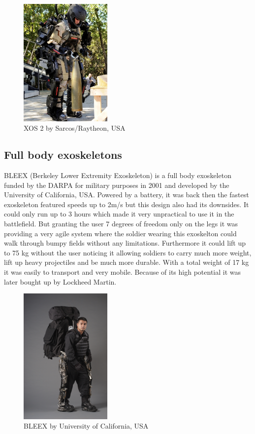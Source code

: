 \documentclass[letterpaper, 10 pt, conference]{ieeeconf}  %
\begin{document}
\newpage

\begin{figure}[H]
  \centering
    \includegraphics[width=0.4\textwidth]{img/xos2}
  \caption{XOS 2 by Sarcos/Raytheon, USA}
\end{figure}

\subsection{Full body exoskeletons}

BLEEX (Berkeley Lower Extremity Exoskeleton) is a full body exoskeleton funded by the DARPA for military purposes in 2001 and developed by the University of California, USA. Powered by a battery, it was back then the fastest exoskeleton featured speeds up to 2m/s but this design also had its downsides. It could only run up to 3 hours which made it very unpractical to use it in the battlefield. But granting the user 7 degrees of freedom only on the legs it was providing a very agile system where the soldier wearing this exoskelton could walk through bumpy fields without any limitations. Furthermore it could lift up to 75 kg without the user noticing it allowing soldiers to carry much more weight, lift up heavy projectiles and be much more durable. With a total weight of 17 kg it was easily to transport and very mobile. Because of its high potential it was later bought up by Lockheed Martin. \newpage



\begin{figure}[H]
  \centering
    \includegraphics[width=0.4\textwidth]{img/bleex}
  \caption{BLEEX by University of California, USA}
\end{figure} 
\end{document}
